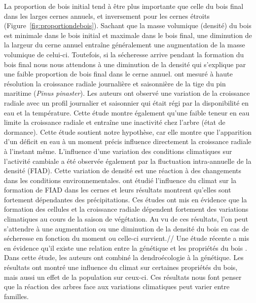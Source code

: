 \documentclass{report}
\begin{document}
\begin{itemize}
	La proportion de bois initial tend à être plus importante que celle du bois final dans les larges cernes annuels, et inversement pour les cernes étroits \citep{Moore2011} (Figure~\ref{fig:proportiondebois}). Sachant que la masse volumique (densité) du bois est minimale dans le bois initial et maximale dans le bois final, une diminution de la largeur du cerne annuel entraîne généralement une augmentation de la masse volumique de celui-ci. Toutefois, si la sécheresse arrive pendant la formation du bois final nous nous attendons à une diminution de la densité qui s'explique par une faible proportion de bois final dans le cerne annuel. \cite{Vieira2013} ont mesuré à haute résolution la croissance radiale journalière et saisonnière de la tige du pin maritime (\textit{Pinus pinaster}). Les auteurs ont observé une variation de la croissance radiale avec un profil journalier et saisonnier qui était régi par la disponibilité en eau et la température. Cette étude montre également qu'une faible teneur en eau limite la croissance radiale et entraîne une inactivité chez l'arbre (état de dormance). Cette étude soutient notre hypothèse, car elle montre que l'apparition d'un déficit en eau à un moment précis influence directement la croissance radiale à l'instant même. L'influence d'une variation des conditions climatiques sur l'activité cambiale a été observée également par la fluctuation intra-annuelle de la densité (FIAD). Cette variation de densité est une réaction à des changements dans les conditions environnementales. \cite{Vieira2015} ont étudié l'influence du climat sur la formation de FIAD dans les cernes %
	et leurs résultats montrent qu'elles sont fortement dépendantes des précipitations. Ces études ont mis en évidence que la formation des cellules et la croissance radiale dépendent fortement des variations climatiques au cours de la saison de végétation. Au vu de ces résultats, l'on peut s'attendre à une augmentation ou une diminution de la densité du bois en cas de sécheresse en fonction du moment ou celle-ci survient.// %
	Une étude récente a mis en évidence qu'il existe une relation entre la génétique et les propriétés du bois \citep{Housset2018}. Dans cette étude, les auteurs ont combiné la dendroécologie à la génétique. Les résultats ont montré une influence du climat sur certaines propriétés du bois, mais aussi un effet de la population sur ceux-ci. Ces résultats nous font penser que la réaction des arbres face aux variations climatiques peut varier entre familles.\\
	

\end{itemize}
\end{document}

